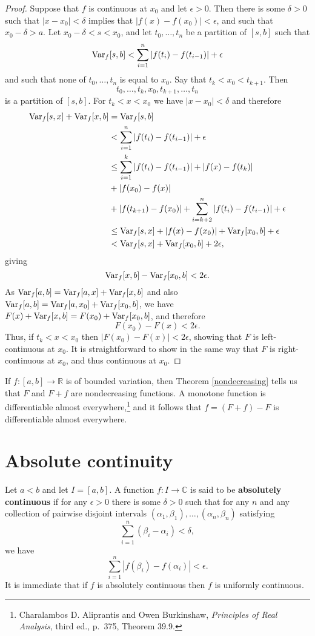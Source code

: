 \documentclass{article}
\newcommand{\Var}{\ensuremath\mathrm{Var}}
\theoremstyle{definition}
\theoremstyle{definition}
\begin{document}
\begin{proof}
Suppose that $f$ is continuous at $x_0$ and let $\epsilon>0$. 
Then there is some $\delta>0$ such that
$|x-x_0|<\delta$ implies that
$|f(x)-f(x_0)|<\epsilon$, and such that $x_0-\delta>a$. Let 
$x_0-\delta<s<x_0$, and  let
$t_0,\ldots,t_n$ be a partition of $[s,b]$ such that
\[
\Var_f[s,b] <\sum_{i=1}^n |f(t_i)-f(t_{i-1})| + \epsilon
\]
and such that none of $t_0,\ldots,t_n$ is equal to $x_0$.
Say that $t_k < x_0 < t_{k+1}$. Then
\[
t_0,\ldots,t_k,x_0,t_{k+1},\ldots,t_n
\]
 is a partition of
$[s,b]$. For $t_k< x< x_0$ we have $|x-x_0| < \delta$ and therefore
\begin{align*}
\Var_f[s,x]+\Var_f[x,b]&=\Var_f[s,b]\\
&<\sum_{i=1}^n |f(t_i)-f(t_{i-1})| + \epsilon\\
&\leq \sum_{i=1}^k  |f(t_i)-f(t_{i-1})| + |f(x)-f(t_k)|\\
&+|f(x_0)-f(x)|\\
&+|f(t_{k+1})-f(x_0)|
+\sum_{i=k+2}^n |f(t_i)-f(t_{i-1})|+\epsilon\\
&\leq \Var_f[s,x]+|f(x)-f(x_0)|+\Var_f[x_0,b]+\epsilon\\
&<\Var_f[s,x]+\Var_f[x_0,b]+2\epsilon,
\end{align*}
giving
\[
\Var_f[x,b]-\Var_f[x_0,b]<2\epsilon.
\]
As  $\Var_f[a,b]=\Var_f[a,x]+\Var_f[x,b]$ and
also
$\Var_f[a,b]=\Var_f[a,x_0]+\Var_f[x_0,b]$, we have
$F(x)+\Var_f[x,b]=F(x_0)+\Var_f[x_0,b]$, and therefore
\[
F(x_0)-F(x)<2\epsilon.
\]
Thus, if $t_k<x<x_0$ then $|F(x_0)-F(x)|<2\epsilon$, showing that 
$F$ is left-continuous at $x_0$. It is straightforward to show in the same way that
$F$ is right-continuous at $x_0$, and thus continuous at $x_0$.
\end{proof}

If $f:[a,b] \to \mathbb{R}$ is of bounded variation, then Theorem \ref{nondecreasing}
tells us that $F$ and $F+f$ are nondecreasing functions. A monotone function is
differentiable almost everywhere,\footnote{Charalambos D. Aliprantis and Owen Burkinshaw, {\em Principles of Real Analysis}, third ed.,
p.~375, Theorem 39.9.} and it follows that $f=(F+f)-F$ is differentiable almost everywhere.




\section{Absolute continuity}
Let $a<b$ and let $I=[a,b]$. A function $f:I \to \mathbb{C}$ is said to be \textbf{absolutely continuous} if
for any $\epsilon>0$ there is some $\delta>0$ such that for any $n$ and any
collection of pairwise disjoint intervals $(\alpha_1,\beta_1),\ldots,(\alpha_n,\beta_n)$
satisfying
\[
\sum_{i=1}^n (\beta_i-\alpha_i) < \delta,
\]
we have
\[
\sum_{i=1}^n |f(\beta_i)-f(\alpha_i)|<\epsilon.
\]
It is immediate that if $f$ is absolutely continuous then $f$ is uniformly continuous.
\end{document}
